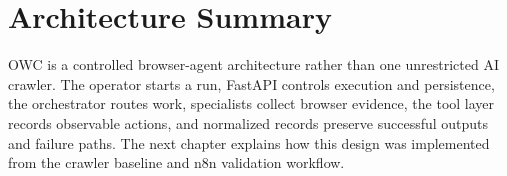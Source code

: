 \section{Architecture Summary}

OWC is a controlled browser-agent architecture rather than one unrestricted AI
crawler. The operator starts a run, FastAPI controls execution and persistence,
the orchestrator routes work, specialists collect browser evidence, the tool
layer records observable actions, and normalized records preserve successful
outputs and failure paths. The next chapter explains how this design was
implemented from the crawler baseline and n8n validation workflow.
